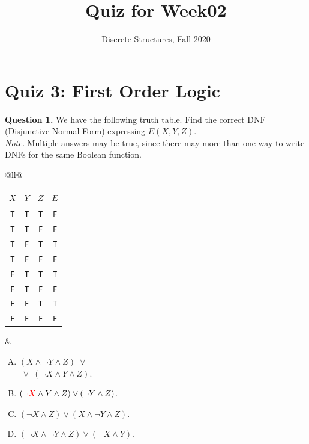 \documentclass[jou]{apa6}
\title{Quiz for Week02}
\author{Discrete Structures, Fall 2020}
\affiliation{RBS}
\begin{document}
\twocolumn

\section{Quiz 3: First Order Logic}




\vspace{6pt}
{\bf Question 1.} We have the following
truth table. 
Find the correct DNF (Disjunctive Normal Form) expressing $E(X,Y,Z)$.\\
{\em Note.} Multiple answers may be true, since
there may more than one way to write DNFs for the same Boolean 
function.


\begin{tabular}{@{}ll@{}} 
\begin{minipage}{0.33\columnwidth}
\noindent
\begin{tabular}{ c | c | c | c }
$X$ & $Y$ & $Z$ & $E$ \\ \hline
{\tt T} & {\tt T} & {\tt T} & {\tt F} \\ \hline
{\tt T} & {\tt T} & {\tt F} & {\tt F} \\ \hline
{\tt T} & {\tt F} & {\tt T} & {\tt T} \\ \hline
{\tt T} & {\tt F} & {\tt F} & {\tt F} \\ \hline
{\tt F} & {\tt T} & {\tt T} & {\tt T} \\ \hline
{\tt F} & {\tt T} & {\tt F} & {\tt F} \\ \hline
{\tt F} & {\tt F} & {\tt T} & {\tt T} \\ \hline
{\tt F} & {\tt F} & {\tt F} & {\tt F} \\ \hline
\end{tabular}
\end{minipage} &
\begin{minipage}{0.65\columnwidth}

\begin{enumerate}[(A)]
\item $(X \wedge \neg Y \wedge Z) \;\vee\;$\\
$\;\vee\; (\neg X \wedge Y \wedge Z)$.
\item $(\textcolor{red}{\neg X} \wedge Y \wedge Z) \vee (\neg Y \wedge Z)$.
\item $(\neg X \wedge Z) \vee (X \wedge \neg Y \wedge Z)$.
\item $(\neg X \wedge \neg Y \wedge Z) \vee (\neg X \wedge Y)$.
\end{enumerate}

\end{minipage}
\end{tabular}
\end{document}
